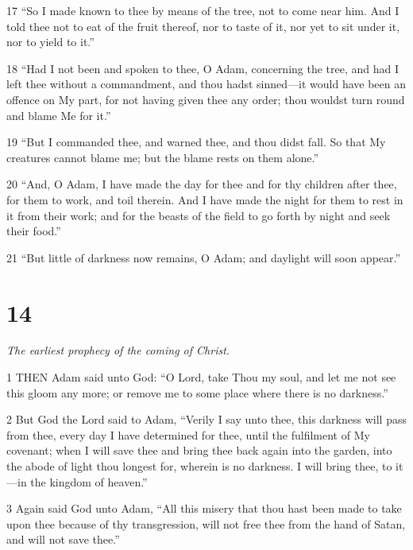 \par 17 “So I made known to thee by means of the tree, not to come near him. And I told thee not to eat of the fruit thereof, nor to taste of it, nor yet to sit under it, nor to yield to it.”

\par 18 “Had I not been and spoken to thee, O Adam, concerning the tree, and had I left thee without a commandment, and thou hadst sinned—it would have been an offence on My part, for not having given thee any order; thou wouldst turn round and blame Me for it.”

\par 19 “But I commanded thee, and warned thee, and thou didst fall. So that My creatures cannot blame me; but the blame rests on them alone.”

\par 20 “And, O Adam, I have made the day for thee and for thy children after thee, for them to work, and toil therein. And I have made the night for them to rest in it from their work; and for the beasts of the field to go forth by night and seek their food.”

\par 21 “But little of darkness now remains, O Adam; and daylight will soon appear.”

\chapter{14}

\par \textit{The earliest prophecy of the coming of Christ.}

\par 1 THEN Adam said unto God: “O Lord, take Thou my soul, and let me not see this gloom any more; or remove me to some place where there is no darkness.”

\par 2 But God the Lord said to Adam, “Verily I say unto thee, this darkness will pass from thee, every day I have determined for thee, until the fulfilment of My covenant; when I will save thee and bring thee back again into the garden, into the abode of light thou longest for, wherein is no darkness. I will bring thee, to it—in the kingdom of heaven.”

\par 3 Again said God unto Adam, “All this misery that thou hast been made to take upon thee because of thy transgression, will not free thee from the hand of Satan, and will not save thee.”

